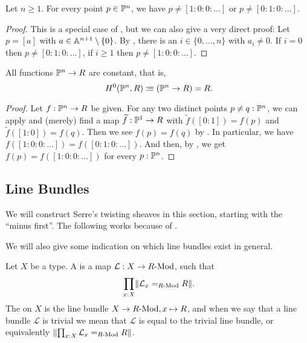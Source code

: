 \begin{lemma}%
  \label{point-in-projective-space-apart-from-two-standard-points}
  Let $n \geq 1$.
  For every point $p \in \mathbb{P}^n$,
  we have $p \neq [1 : 0 : 0 : \dots]$
  or $p \neq [0 : 1 : 0 : \dots]$.
\end{lemma}

\begin{proof}
  This is a special case of ,
  but we can also give a very direct proof:
  Let $p = [a]$ with $a \in \mathbb{A}^{n+1} \setminus \{0\}$.
  By ,
  there is an $i \in \{0, \dots, n\}$ with $a_i \neq 0$.
  If $i = 0$ then $p \neq [0 : 1 : 0 : \dots]$,
  if $i \geq 1$ then $p \neq [1 : 0 : 0 : \dots]$.
\end{proof}

\begin{theorem}%
  \label{functions-on-projective-space-constant}
  All functions $\mathbb{P}^n \to R$ are constant,
  that is,
  \[ H^0(\bP^n, R) \colonequiv (\bP^n \to R) = R \rlap{.} \]
\end{theorem}

\begin{proof}
  Let $f : \mathbb{P}^n \to R$ be given.
  For any two distinct points $p \neq q : \mathbb{P}^n$,
  we can apply 
  and (merely) find a map $\widetilde{f} : \mathbb{P}^1 \to R$
  with $\widetilde{f}([0 : 1]) = f(p)$
  and $\widetilde{f}([1 : 0]) = f(q)$.
  Then we see $f(p) = f(q)$
  by .
  In particular, we have $f([1 : 0 : 0 : \dots]) = f([0 : 1 : 0 : \dots])$.
  And then, by ,
  we get $f(p) = f([1 : 0 : 0 : \dots])$ for every $p : \mathbb{P}^n$.
\end{proof}


\subsection{Line Bundles}

We will construct Serre's twisting sheaves in this section,
starting with the ``minus first''.
The following works because of .

We will also give some indication on which line bundles exist in general.

\begin{definition}%
  Let $X$ be a type.
  A  is a map $\mathcal L : X\to R\text{-}\mathrm{Mod}$,
  such that
  \[ \prod_{x:X} \propTrunc{\mathcal L_x=_{\Mod{R}}R} \rlap{.}\]
  The  on $X$ is the line bundle
  $X \to R\text{-}\mathrm{Mod}, x \mapsto R$,
  and when we say that a line bundle $\mathcal{L}$ is trivial
  we mean that $\mathcal{L}$ is equal to the trivial line bundle,
  or equivalently $\lVert \prod_{x:X} \mathcal L_x=_{R\text{-}\mathrm{Mod}}R \rVert$.
\end{definition}

